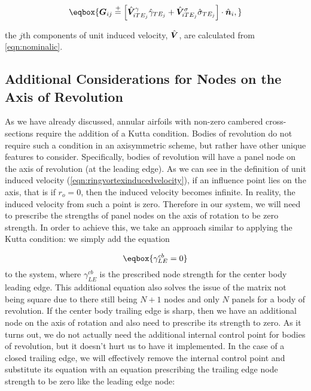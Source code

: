 \begin{equation}
    \label{eqn:teaicaugment}
    \eqbox{
    \vect{G}_{ij} \stackrel{+}{=}  \left[\hat{\vect{V}}^\gamma_{iTE_j}\hat{\gamma}_{TE_j} + \hat{\vect{V}}^\sigma_{iTE_j}\hat{\sigma}_{TE_j}\right]\cdot\hat{\vect{n}}_i,
}
\end{equation}

\where the \(j\)th components of unit induced velocity, \(\hat{\bm{V}}\), are calculated from \cref{eqn:nominalic}.



\subsection{Additional Considerations for Nodes on the Axis of Revolution}

As we have already discussed, annular airfoils with non-zero cambered cross-sections require the addition of a Kutta condition.
%
Bodies of revolution do not require such a condition in an axisymmetric scheme, but rather have other unique features to consider.
%
Specifically, bodies of revolution will have a panel node on the axis of revolution (at the leading edge).
%
As we can see in the definition of unit induced velocity (\cref{eqn:ringvortexinducedvelocity}), if an influence point lies on the axis, that is if \(r_o = 0\), then the induced velocity becomes infinite.
%
In reality, the induced velocity from such a point is zero.
%
Therefore in our system, we will need to prescribe the strengths of panel nodes on the axis of rotation to be zero strength.
%
In order to achieve this, we take an approach similar to applying the Kutta condition: we simply add the equation

\begin{equation}
    \eqbox{
    \gamma_{LE}^{cb} = 0
}
\end{equation}
%
to the system, where \(\gamma_{LE}^{cb}\) is the prescribed node strength for the center body leading edge.
%
This additional equation also solves the issue of the matrix not being square due to there still being \(N+1\) nodes and only \(N\) panels for a body of revolution.
%
If the center body trailing edge is sharp, then we have an additional node on the axis of rotation and also need to prescribe its strength to zero.
%
As it turns out, we do not actually need the additional internal control point for bodies of revolution, but it doesn't hurt us to have it implemented.
%
In the case of a closed trailing edge, we will effectively remove the internal control point and substitute its equation with an equation prescribing the trailing edge node strength to be zero like the leading edge node:

